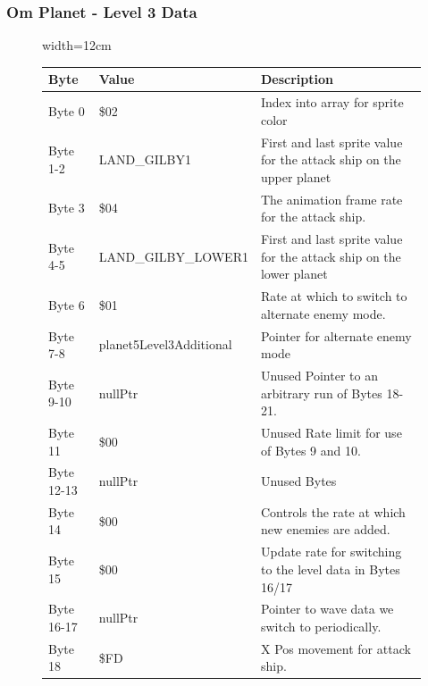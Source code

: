 \clearpage
\subsubsection{Om Planet - Level 3 Data}

\begin{figure}[H]
  {
  \setlength{\tabcolsep}{3.0pt}
  \setlength\cmidrulewidth{\heavyrulewidth} %
  \begin{adjustbox}{width=12cm}

\begin{tabular}{lll}
\toprule
 Byte       & Value                     & Description                                                         \\
\midrule
 Byte 0     & \$02                       & Index into array for sprite color                                   \\
 Byte 1-2   & LAND\_GILBY1               & First and last sprite value for the attack ship on the upper planet \\
 Byte 3     & \$04                       & The animation frame rate for the attack ship.                       \\
 Byte 4-5   & LAND\_GILBY\_LOWER1   & First and last sprite value for the attack ship on the lower planet \\
 Byte 6     & \$01                       & Rate at which to switch to alternate enemy mode.                    \\
 Byte 7-8   & planet5Level3Additional   & Pointer for alternate enemy mode                                    \\
 Byte 9-10  & nullPtr                   & Unused Pointer to an arbitrary run of Bytes 18-21.                  \\
 Byte 11    & \$00                       & Unused Rate limit for use of Bytes 9 and 10.                        \\
 Byte 12-13 & nullPtr                   & Unused Bytes                                                        \\
 Byte 14    & \$00                       & Controls the rate at which new enemies are added.                   \\
 Byte 15    & \$00                       & Update rate for switching to the level data in Bytes 16/17          \\
 Byte 16-17 & nullPtr                   & Pointer to wave data we switch to periodically.                     \\
 Byte 18    & \$FD                       & X Pos movement for attack ship.                                     \\

\end{tabular}
\end{adjustbox}}
\end{figure}
